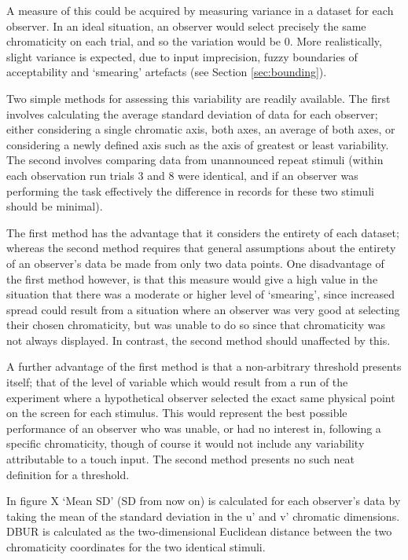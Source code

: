 A measure of this could be acquired by measuring variance in a dataset for each observer. In an ideal situation, an observer would select precisely the same chromaticity on each trial, and so the variation would be 0. More realistically, slight variance is expected, due to input imprecision, fuzzy boundaries of acceptability and `smearing' artefacts (see Section \ref{sec:bounding}).

Two simple methods for assessing this variability are readily available. The first involves calculating the average standard deviation of data for each observer; either considering a single chromatic axis, both axes, an average of both axes, or considering a newly defined axis such as the axis of greatest or least variability. The second involves comparing data from unannounced repeat stimuli (within each observation run trials 3 and 8 were identical, and if an observer was performing the task effectively the difference in records for these two stimuli should be minimal).


The first method has the advantage that it considers the entirety of each dataset; whereas the second method requires that general assumptions about the entirety of an observer's data be made from only two data points. One disadvantage of the first method however, is that this measure would give a high value in the situation that there was a moderate or higher level of `smearing', since increased spread could result from a situation where an observer was very good at selecting their chosen chromaticity, but was unable to do so since that chromaticity was not always displayed. In contrast, the second method should unaffected by this.

A further advantage of the first method is that a non-arbitrary threshold presents itself; that of the level of variable which would result from a run of the experiment where a hypothetical observer selected the exact same physical point on the screen for each stimulus. This would represent the best possible performance of an observer who was unable, or had no interest in, following a specific chromaticity, though of course it would not include any variability attributable to a touch input. The second method presents no such neat definition for a threshold.


In figure X `Mean SD' (SD from now on) is calculated for each observer's data by taking the mean of the standard deviation in the u' and v' chromatic dimensions. \gls{DBUR} is calculated as the two-dimensional Euclidean distance between the two chromaticity coordinates for the two identical stimuli.

